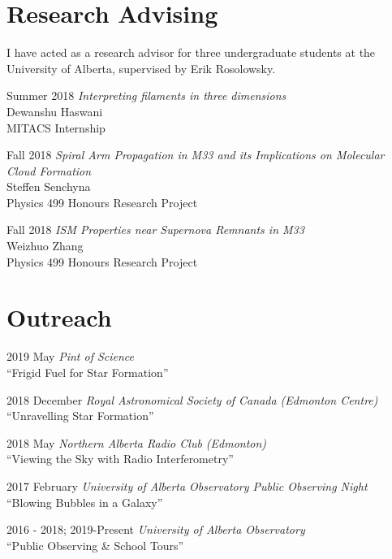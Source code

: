 \documentclass[letterpaper,11pt]{article}
\newlength{\mainindent} \setlength{\mainindent}{12pt}
\newlength{\contentindent} \setlength{\contentindent}{19ex}
\newenvironment{datelist}{
  \begingroup
  \raggedright
  \begin{description}[labelindent=\mainindent,leftmargin=\contentindent,
      style=sameline,font=\normalfont,topsep=0pt,partopsep=0pt,parsep=0pt,
      itemsep=4pt]
}{
  \end{description}
  \endgroup
}
\begin{document}
\section*{Research Advising}

I have acted as a research advisor for three undergraduate students at the University of Alberta, supervised by Erik Rosolowsky.
\vspace{0.1in}
\begin{datelist}
\item[Summer 2018]
  \emph{Interpreting filaments in three dimensions} \\
  Dewanshu Haswani \\
  MITACS Internship
\item[Fall 2018]
  \emph{Spiral Arm Propagation in M33 and its Implications on Molecular Cloud Formation} \\
  Steffen Senchyna \\
  Physics 499 Honours Research Project
\item[Fall 2018]
  \emph{ISM Properties near Supernova Remnants in M33} \\
  Weizhuo Zhang \\
  Physics 499 Honours Research Project
\end{datelist}





\section*{Outreach}
\begin{datelist}
\item[2019 May] \emph{Pint of Science} \\ ``Frigid Fuel for Star Formation''
\item[2018 December] \emph{Royal Astronomical Society of Canada (Edmonton Centre)} \\ ``Unravelling Star Formation''
\item[2018 May] \emph{Northern Alberta Radio Club (Edmonton)} \\ ``Viewing the Sky with Radio Interferometry''
\item[2017 February] \emph{University of Alberta Observatory Public Observing Night} \\ ``Blowing Bubbles in a Galaxy''
\item[2016 - 2018; 2019-Present] \emph{University of Alberta Observatory} \\ ``Public Observing \& School Tours''
\end{datelist}
\end{document}
